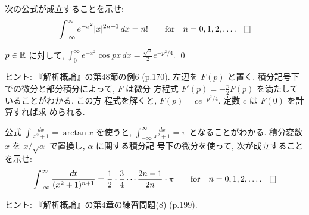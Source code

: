 \documentclass[12pt,twoside]{jarticle}
\begin{document}
\begin{question}
  次の公式が成立することを示せ:
  \[
    \int_{-\infty}^\infty e^{-x^2}|x|^{2n+1} \,dx = n!
    \qquad \text{for} \quad
    n = 0,1,2,\ldots.
  \qed
  \]
\end{question}

\begin{question}
  $p\in{\mathbb R}$ に対して,
  \( \displaystyle%
    \int_0^\infty e^{-x^2} \cos px \,dx
    =
    \frac{\sqrt{\pi}}{2} e^{-p^2/4}
  \). %
  \qed
\end{question}

\noindent ヒント: 『解析概論』の第48節の例6 (p.170). %
左辺を $F(p)$ と置く. 積分記号下での微分と部分積分によって, $F$ は微分
方程式 $F'(p) = - \frac{p}{2} F(p)$ を満たしていることがわかる. この方
程式を解くと, $F(p) = c e^{-p^2/4}$. 定数 $c$ は $F(0)$ を計算すれば求
められる.

\begin{question}
  公式 $\int \frac{dx}{x^2+1} = \arctan x$ を使うと, %
  $\int_{-\infty}^\infty \frac{dx}{x^2+1} = \pi$ となることがわかる. %
  積分変数 $x$ を $x/\sqrt{\alpha}$ で置換し, $\alpha$ に関する積分記
  号下の微分を使って, 次が成立することを示せ:
  \[
    \int_{-\infty}^\infty \frac{dt}{(x^2 + 1)^{n+1}}
    =
    \frac{1}{2} \cdot \frac{3}{4} \cdots \frac{2n-1}{2n} \cdot \pi
    \qquad \text{for} \quad
    n = 0,1,2,\ldots.
  \qed
  \]
\end{question}

\noindent ヒント: 『解析概論』の第4章の練習問題(8) (p.199).


%

\end{document}
